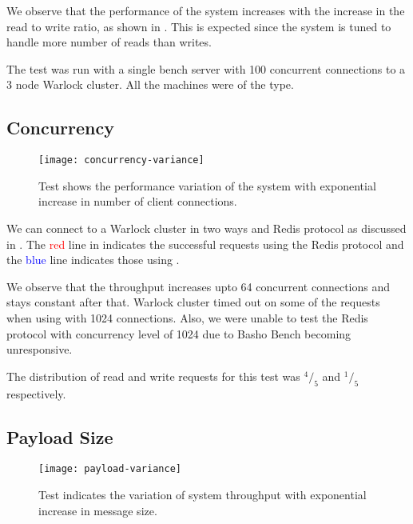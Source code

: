 We observe that the performance of the system increases with the increase in
the read to write ratio, as shown in . This is
expected since the system is tuned to handle more number of reads than writes.

The test was run with a single bench server with 100 concurrent connections to
a 3 node Warlock cluster. All the machines were of the  type.

\subsection{Concurrency}

\begin{figure}
  \begin{whole}
    \texttt{[image: concurrency-variance]}
    \caption[Concurrency Test]{%
      Test shows the performance variation of the system with exponential
      increase in number of client connections.
    }
    \label{figure:res.concurrency}
  \end{whole}
\end{figure}

We can connect to a Warlock cluster in two ways \dash{}  and Redis
protocol
as discussed in . The \textcolor{red}{red} line
in  indicates the successful requests using the
Redis protocol and the \textcolor{blue}{blue} line indicates those using
.

We observe that the throughput increases upto 64 concurrent connections and
stays constant after that. Warlock cluster timed out on some of the requests
when using  with 1024 connections. Also, we were unable to test the 
Redis protocol
with concurrency level of 1024 due to Basho Bench becoming unresponsive.

The distribution of read and write requests for this test was ${}^4/_5$ and
${}^1/_5$ respectively.

\subsection{Payload Size}

\begin{figure}
  \begin{whole}
    \texttt{[image: payload-variance]}
    \caption[Payload Throughput Test]{%
      Test indicates the variation of system throughput with exponential
      increase in message size.
    }
    \label{figure:res.payload.throughput}
  \end{whole}
\end{figure}

